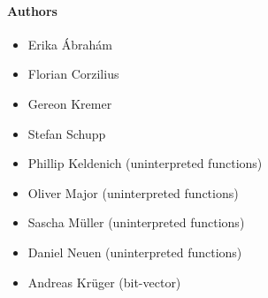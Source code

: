 \documentclass{article}
\begin{document}
\paragraph{Authors}
\begin{itemize}
\item Erika \'Abrah\'am
\item Florian Corzilius
\item Gereon Kremer
\item Stefan Schupp
\item Phillip Keldenich (uninterpreted functions)
\item Oliver Major (uninterpreted functions)
\item Sascha M\"uller (uninterpreted functions)
\item Daniel Neuen (uninterpreted functions)
\item Andreas Kr\"uger (bit-vector)
\end{itemize}


  
\end{document}

